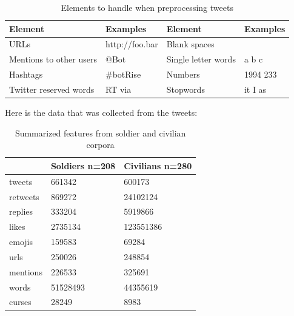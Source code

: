 \begin{table}[h]
  \caption{Elements to handle when preprocessing tweets}
  \label{table:elementsRemoved}
  \centering
  \renewcommand{\tabularxcolumn}{m} %
  \begin{tabularx}{0.8\textwidth}{l  l || l  l}
    \toprule
    \textbf{Element} & \textbf{Examples} & \textbf{Element}    & \textbf{Examples}
    \tabularnewline \midrule
    URLs
                     &
    http://foo.bar   & Blank spaces      &
    \tabularnewline \hline
    Mentions to other users
                     & @Bot              & Single letter words & a b c
    \tabularnewline \hline
    Hashtags
                     & \#botRise         & Numbers             & 1994 233
    \tabularnewline \hline
    Twitter reserved words
                     & RT via            & Stopwords
                     & it I as
    \tabularnewline \bottomrule
  \end{tabularx}
\end{table}

Here is the data that was collected from the tweets:

\begin{table}[h]
  \caption{Summarized features from soldier and civilian corpora}
  \label{table:summarized}
  \centering
  \renewcommand{\tabularxcolumn}{m} %
  \begin{tabularx}{0.5\textwidth}{l | l | l}
    \toprule
             & Soldiers n=208 & Civilians n=280
    \tabularnewline \hline
    tweets   & 661342         & 600173
    \tabularnewline \hline
    retweets & 869272         & 24102124
    \tabularnewline \hline
    replies  & 333204         & 5919866
    \tabularnewline \hline
    likes    & 2735134        & 123551386
    \tabularnewline \hline
    emojis   & 159583         & 69284
    \tabularnewline \hline
    urls     & 250026         & 248854
    \tabularnewline \hline
    mentions & 226533         & 325691
    \tabularnewline \hline
    words    & 51528493       & 44355619
    \tabularnewline \hline
    curses   & 28249          & 8983
    \tabularnewline \bottomrule
  \end{tabularx}
\end{table}


